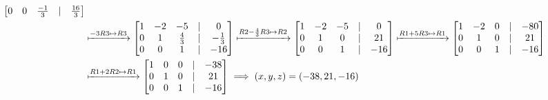 \begin{align*}
\begin{bmatrix}
        0 & 0 & \frac{-1}{3} & | & \frac{16}{3} \\
    \end{bmatrix} \\
    &\xmapsto{-3R3 \mapsto R3} \begin{bmatrix}
        1 & -2 & -5 & | & 0 \\
        0 & 1 & \frac{4}{3} & | & -\frac{1}{3} \\
        0 & 0 & 1 & | & -16 \\
    \end{bmatrix} \xmapsto{R2 - \frac{4}{3}R3 \mapsto R2} \begin{bmatrix}
        1 & -2 & -5 & | & 0 \\
        0 & 1 & 0 & | & 21 \\
        0 & 0 & 1 & | & -16 \\
    \end{bmatrix} \xmapsto{R1 + 5R3 \mapsto R1} \begin{bmatrix}
        1 & -2 & 0 & | & -80 \\
        0 & 1 & 0 & | & 21 \\
        0 & 0 & 1 & | & -16 \\
    \end{bmatrix} \\
    &\xmapsto{R1 + 2R2 \mapsto R1} \begin{bmatrix}
        1 & 0 & 0 & | & -38 \\
        0 & 1 & 0 & | & 21 \\
        0 & 0 & 1 & | & -16 \\
    \end{bmatrix} \implies (x, y, z) = (-38, 21, -16)
\end{align*}